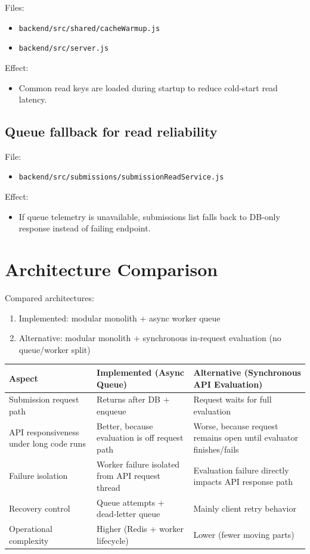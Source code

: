 \documentclass[12pt,journal,onecolumn]{IEEEtran}
\begin{document}
Files:
\begin{itemize}
    \item \texttt{backend/src/shared/cacheWarmup.js}
    \item \texttt{backend/src/server.js}
\end{itemize}

Effect:
\begin{itemize}
    \item Common read keys are loaded during startup to reduce cold-start read latency.
\end{itemize}

\subsection{Queue fallback for read reliability}

File:
\begin{itemize}
    \item \texttt{backend/src/submissions/submissionReadService.js}
\end{itemize}

Effect:
\begin{itemize}
    \item If queue telemetry is unavailable, submissions list falls back to DB-only response instead of failing endpoint.
\end{itemize}

\section{Architecture Comparison}

Compared architectures:

\begin{enumerate}
    \item Implemented: modular monolith + async worker queue
    \item Alternative: modular monolith + synchronous in-request evaluation (no queue/worker split)
\end{enumerate}

\begin{longtable}{|p{3.2cm}|p{5.3cm}|p{5.3cm}|}
\hline
\textbf{Aspect} & \textbf{Implemented (Async Queue)} & \textbf{Alternative (Synchronous API Evaluation)} \\
\hline
Submission request path & Returns after DB + enqueue & Request waits for full evaluation \\
\hline
API responsiveness under long code runs & Better, because evaluation is off request path & Worse, because request remains open until evaluator finishes/fails \\
\hline
Failure isolation & Worker failure isolated from API request thread & Evaluation failure directly impacts API response path \\
\hline
Recovery control & Queue attempts + dead-letter queue & Mainly client retry behavior \\
\hline
Operational complexity & Higher (Redis + worker lifecycle) & Lower (fewer moving parts) \\
\hline
\end{longtable}
\end{document}
